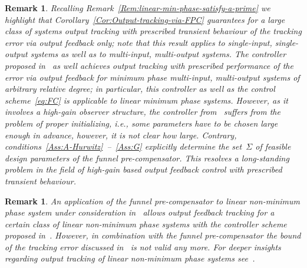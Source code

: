 \documentclass[ envcountsect, envcountsame]{svjour3}
\newtheorem{Remark}[Theorem]{Remark}
\begin{document}
\begin{Remark} %
Recalling Remark~\ref{Rem:linear-min-phase-satisfy-a-prime} we highlight that Corollary~\ref{Cor:Output-tracking-via-FPC} guarantees for a large class of systems output tracking with prescribed transient behaviour of the tracking error 
via output feedback only; note that this result applies to single-input, single-output systems as well as to multi-input, multi-output systems.
%
The controller proposed in~\cite{DimaBech20} as well achieves output tracking with prescribed performance of the error via output feedback for minimum phase multi-input, multi-output systems of arbitrary relative degree; in particular, this controller as well as the control scheme~\eqref{eq:FC} is applicable to linear minimum phase systems. 
However, as it involves a high-gain observer structure, the controller from~\cite{DimaBech20} suffers from the problem of proper initializing, i.e., some parameters have to be chosen large enough in advance, however, it is not clear how large.
Contrary, conditions~\ref{Ass:A-Hurwitz}~--~\ref{Ass:G} explicitly determine the set~$\Sigma$ of feasible design parameters of the funnel pre-compensator.
%
This resolves a long-standing problem in the field of high-gain based output feedback control with prescribed transient behaviour.
\end{Remark}

\begin{Remark}
An application of the funnel pre-compensator to linear non-minimum phase system under consideration in~\cite{Berg20} allows output feedback tracking for a certain class of linear non-minimum phase systems with the controller scheme proposed in~\cite[Sec.~3]{Berg20}.
However, in combination with the funnel pre-compensator the bound of the tracking error discussed in~\cite[Sec.~4]{Berg20} is not valid any more.
For deeper insights regarding output tracking of linear non-minimum phase systems see~\cite{Berg20}.
\end{Remark}
\end{document}
